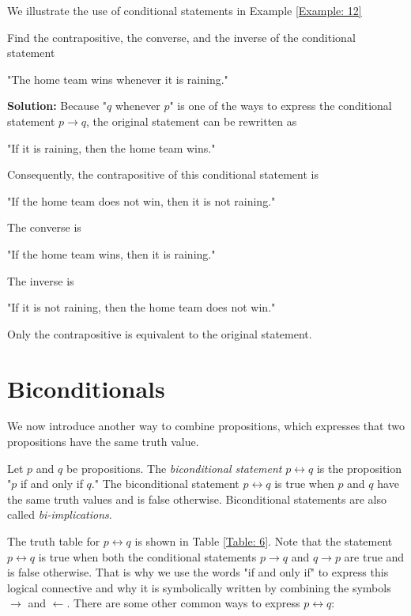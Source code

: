 \documentclass{Axon}
\begin{document}
We illustrate the use of conditional statements in Example \ref{Example: 12}

\begin{example}\label{Example: 12}
    Find the contrapositive, the converse, and the inverse of the conditional statement
    \begin{center}
        "The home team wins whenever it is raining."
    \end{center}

    \noindent
    \textbf{Solution:}
    Because "\(q\) whenever \(p\)" is one of the ways to express the conditional statement \(p \to q\), the original statement can be rewritten as
    \begin{center}
        "If it is raining, then the home team wins."
    \end{center}
    Consequently, the contrapositive of this conditional statement is
    \begin{center}
        "If the home team does not win, then it is not raining."
    \end{center}
    The converse is
    \begin{center}
        "If the home team wins, then it is raining."
    \end{center}
    The inverse is
    \begin{center}
        "If it is not raining, then the home team does not win."
    \end{center}
    Only the contrapositive is equivalent to the original statement.
\end{example}

\section{Biconditionals}
We now introduce another way to combine propositions, which expresses that two propositions have the same truth value.

\begin{definition}
    Let \(p\) and \(q\) be propositions. The \textit{biconditional statement} \(p \leftrightarrow q\) is the proposition "\(p\) if and only if \(q\)." The biconditional statement \(p \leftrightarrow q\) is true when \(p\) and \(q\) have the same truth values and is false otherwise. Biconditional statements are also called \textit{bi-implications}.
\end{definition}

The truth table for \(p \leftrightarrow q\) is shown in Table \ref{Table: 6}. Note that the statement \(p \leftrightarrow q\) is true when both the conditional statements \(p \to q\) and \(q \to p\) are true and is false otherwise. That is why we use the words "if and only if" to express this logical connective and why it is symbolically written by combining the symbols \(\to\) and \(\leftarrow\). There are some other common ways to express \(p \leftrightarrow q\):
\end{document}
